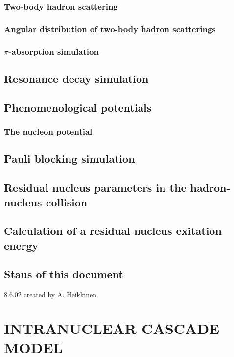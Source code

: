 \subsubsection{Two-body hadron scattering}
\subsubsection{Angular distribution of two-body hadron scatterings}
\subsubsection{$\pi$-absorption simulation}

\subsection{Resonance decay simulation}

\subsection{Phenomenological potentials}
\subsubsection{The nucleon potential}

\subsection{Pauli blocking simulation}

\subsection{Residual nucleus parameters in the hadron-nucleus collision}

\subsection{Calculation of a residual nucleus exitation energy}

\subsection{Staus of this document}
8.6.02 created by A. Heikkinen

\section{INTRANUCLEAR CASCADE MODEL}

